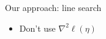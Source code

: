 \documentclass[ 10pt]{beamer}
\newcommand{\etaMLE}{\hat{\eta}_{\textrm{MLE}}}
\begin{document}
{\begin{columns}[]
\begin{column}[t]{0.4\textwidth}
{\begin{block}{Our approach: line search}
\begin{itemize}
\item Don't use $\nabla^2 \ell( \eta)$
\vspace{2mm}
\end{itemize}
\end{block}
}
\end{column}
\end{columns}

}

%
%
%
%
\end{document}

